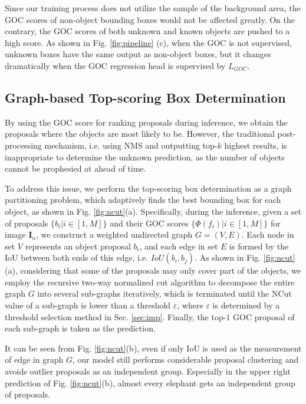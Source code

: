 \documentclass[10pt,twocolumn,letterpaper]{article}
\begin{document}
Since our training process does not utilize the sample of the background area,
the GOC scores of non-object bounding boxes would not be affected greatly.
On the contrary, the GOC scores of both unknown and known objects are pushed to a high score.
As shown in Fig. \ref{fig:pipeline} (c),
when the GOC is not supervised,
unknown boxes have the same output as non-object boxes,
but it changes dramatically when the GOC regression head is supervised by $L_{GOC}$.



\subsection{Graph-based Top-scoring Box Determination}
\label{sec:Ncut}
By using the GOC score for ranking proposals during inference,
we obtain the proposals where the objects are most likely to be.
However,
the traditional post-processing mechanism, i.e. using NMS and outputting top-$k$ highest results, is inappropriate to determine the unknown prediction,
as the number of objects cannot be prophesied at ahead of time.

To address this issue,
we perform the top-scoring box determination as a graph partitioning problem,
which adaptively finds the best bounding box for each object,
as shown in Fig. \ref{fig:ncut}(a).
Specifically,
during the inference,
given a set of proposals $\{b_i|i\in[1,M]\}$ and their GOC scores $\{\Phi(f_i)|i\in[1,M]\}$ for image $\mathbf{I}_n$,
we construct a weighted undirected graph $G=(V,E)$.
Each node in set $V$ represents an object proposal $b_i$,
and each edge in set $E$ is formed by the IoU between both ends of this edge, i.e. $IoU(b_i,b_j)$.
As shown in Fig. \ref{fig:ncut}(a),
considering that some of the proposals may only cover part of the objects,
we employ the recursive two-way normalized cut algorithm \cite{ncut} to decompose the entire graph $G$ into several sub-graphs iteratively,
which is terminated until the NCut value \cite{ncut} of a sub-graph is lower than a threshold $\varepsilon$,
where $\varepsilon$ is determined by a threshold selection method in Sec. \ref{sec:imp}.
Finally, the top-$1$ GOC proposal of each sub-graph is taken as the prediction.

It can be seen from Fig. \ref{fig:ncut}(b),
even if only IoU is used as the measurement of edge in graph $G$,
our model still performs considerable proposal clustering and avoids outlier proposals as an independent group.
Especially in the upper right prediction of Fig. \ref{fig:ncut}(b),
almost every elephant gets an independent group of proposals.
\end{document}
